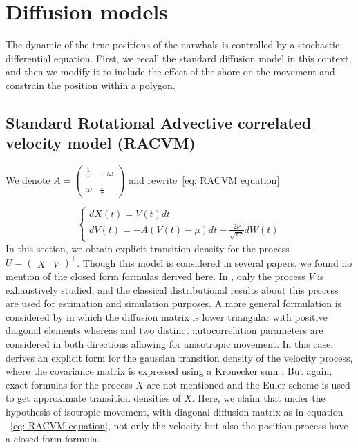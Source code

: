 \documentclass[11pt]{article}
\newcommand {\1}{\mathbb{1}}
\theoremstyle{definition}
\theoremstyle{remark}
\theoremstyle{remark}
\begin{document}
\section{Diffusion models}

The dynamic of the true positions of the narwhals is controlled by a stochastic differential equation. First, we recall the standard diffusion model in this context, and then we modify it to include the effect of the shore on the movement and constrain the position within a polygon.


\subsection{Standard Rotational Advective correlated velocity model (RACVM)}
\label{section: RACVM}


We denote $A=\begin{pmatrix} 
	\frac{1}{\tau} & -\omega \\
	\omega & \frac{1}{\tau}
\end{pmatrix}$ and rewrite~\eqref{eq: RACVM equation}

\begin{equation*} \left\{
	\begin{array}{l}
		dX(t)=V(t)dt \\
		dV(t)=-A(V(t)-\mu)dt+\frac{2\nu}{\sqrt{\pi \tau}} dW(t) 
	\end{array}
	\right.
	\label{eq: RACVM equation bis}
\end{equation*}
In this section, we obtain explicit transition density for the process $U=\begin{pmatrix} X & V \end{pmatrix}^\top$. Though this model is considered in several papers, we found no mention of the closed form formulas derived here. In \cite{gurarie_correlated_2017}, only the process $V$ is exhaustively studied, and the classical distributional results about this process are used for estimation and simulation purposes.
A more general formulation is considered by \cite{albertsen_generalizing_2018} in which the diffusion matrix is lower triangular with positive diagonal elements whereas and two distinct autocorrelation parameters are considered in both directions allowing for anisotropic movement.
In this case, \cite{albertsen_generalizing_2018} derives an explicit form for the gaussian transition density of the velocity process, where the covariance matrix is expressed using a Kronecker sum \cite{albertsen_generalizing_2018}. But again, exact formulas for the process $X$ are not mentioned and the Euler-scheme is used to get approximate transition densities of $X$. Here, we claim that under the hypothesis of isotropic movement, with diagonal diffusion matrix as in equation ~\eqref{eq: RACVM equation}, not only the velocity but also the position process have a closed form formula. \\
\end{document}
